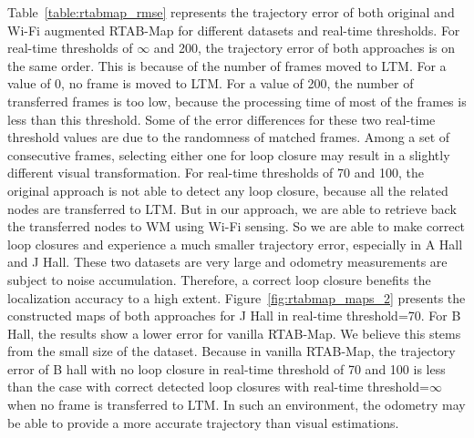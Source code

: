 Table~\ref{table:rtabmap_rmse} represents the trajectory error of both original and Wi-Fi augmented RTAB-Map for different datasets and {real-time thresholds}. 
For {real-time thresholds} of $\infty$ and 200, the trajectory error of both approaches is on the same order.
This is because of the number of frames moved to LTM. For a value of 0, no frame is moved to LTM. 
For a value of 200, the number of transferred frames is too low, because the processing time of most of the frames is less than this threshold.
Some of the error differences for these two real-time threshold values are due to the randomness of matched frames. 
Among a set of consecutive frames, selecting either one for loop closure may result in a slightly different visual transformation. 
For {real-time thresholds} of 70 and 100, the original approach is not able to detect any loop closure, because all the related nodes are transferred to LTM. 
But in our approach, we are able to retrieve back the transferred nodes to WM using Wi-Fi sensing. 
So we are able to make correct loop closures and experience a much smaller trajectory error, especially in A Hall and J Hall. 
These two datasets are very large and odometry measurements are subject to noise accumulation. 
Therefore, a correct loop closure benefits the localization accuracy to a high extent. 
Figure~\ref{fig:rtabmap_maps_2} presents the constructed maps of both approaches for J Hall in {real-time threshold}=70. %
For B Hall, the results show a lower error for vanilla RTAB-Map. 
We believe this stems from the small size of the dataset. 
Because in vanilla RTAB-Map, the trajectory error of B hall with no loop closure in {real-time threshold} of 70 and 100 is less than the case with correct detected loop closures with {real-time threshold}=$\infty$ when no frame is transferred to LTM. 
In such an environment, the odometry may be able to provide a more accurate trajectory than visual estimations. 

